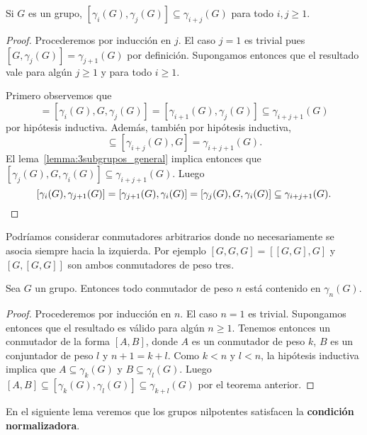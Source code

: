 \begin{theorem}
	\label{theorem:gamma}
	Si $G$ es un grupo, $[\gamma_i(G),\gamma_j(G)]\subseteq
	\gamma_{i+j}(G)$ para todo $i,j\geq1$.	
\end{theorem}

\begin{proof}
	Procederemos por inducción en $j$. El caso $j=1$ es trivial pues
	$[G,\gamma_j(G)]=\gamma_{j+1}(G)$ por definición. Supongamos entonces que
	el resultado vale para algún $j\geq1$ y para todo $i\geq1$. 
	
	Primero observemos que 
	\begin{equation*}
		[G,\gamma_i(G),\gamma_j(G)]=[\gamma_i(G),G,\gamma_j(G)]=[\gamma_{i+1}(G),\gamma_j(G)]\subseteq \gamma_{i+j+1}(G)
	\end{equation*}
	por hipótesis inductiva. Además, también por hipótesis inductiva, 
	\begin{equation*}
	[\gamma_i(G),\gamma_j(G),G]\subseteq [\gamma_{i+j}(G),G]=\gamma_{i+j+1}(G).
	\end{equation*}
	El lema~\ref{lemma:3subgrupos_general} implica entonces que $[\gamma_j(G),G,\gamma_i(G)]\subseteq \gamma_{i+j+1}(G)$. Luego 
	\[
	[\gamma_i(G),\gamma_{j+1}(G)]=[\gamma_{j+1}(G),\gamma_i(G)]=[\gamma_j(G),G,\gamma_i(G)]\subseteq \gamma_{i+j+1}(G).\qedhere
	\]
\end{proof}

Podríamos considerar conmutadores arbitrarios donde no necesariamente se asocia
siempre hacia la izquierda. Por ejemplo $[G,G,G]=[ [G,G],G]$ y $[G,[G,G]]$ son
ambos conmutadores de peso tres. 

\begin{corollary}
	Sea $G$ un grupo.  Entonces todo conmutador de peso $n$ está contenido en
	$\gamma_n(G)$.
\end{corollary}

\begin{proof}
	Procederemos por inducción en $n$. El caso $n=1$ es trivial. Supongamos
	entonces que el resultado es válido para algún $n\geq1$.  Tenemos entonces
	un conmutador de la forma $[A,B]$, donde $A$ es un conmutador de peso $k$,
	$B$ es un conjuntador de peso $l$ y $n+1=k+l$. Como $k<n$ y $l<n$, la
	hipótesis inductiva implica que $A\subseteq \gamma_k(G)$ y $B\subseteq
	\gamma_l(G)$. Luego $[A,B]\subseteq [\gamma_k(G),\gamma_l(G)]\subseteq
	\gamma_{k+l}(G)$ por el
	teorema anterior. 
\end{proof}


En el siguiente lema veremos que los grupos nilpotentes satisfacen la
\textbf{condición normalizadora}.

